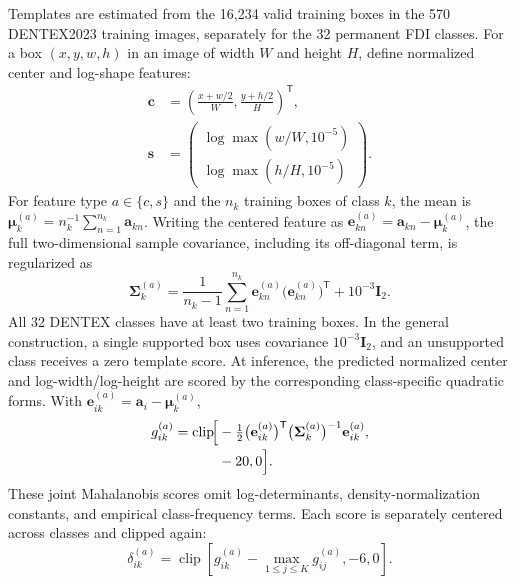 \documentclass[a4paper,fleqn]{cas-dc}
\begin{document}
Templates are estimated from the 16,234 valid training boxes in the 570 DENTEX2023 training images, separately for the 32 permanent FDI classes. For a box $(x,y,w,h)$ in an image of width $W$ and height $H$, define normalized center and log-shape features:
\begin{equation}
 \begin{aligned}
 \mathbf c&=\left(\frac{x+w/2}{W},\frac{y+h/2}{H}\right)^{\mathsf T},\\
 \mathbf s&=\begin{pmatrix}
  \log\max(w/W,10^{-5})\\
  \log\max(h/H,10^{-5})
 \end{pmatrix}.
 \end{aligned}
 \label{eq:geometry-features}
\end{equation}
For feature type $a\in\{c,s\}$ and the $n_k$ training boxes of class $k$, the mean is $\boldsymbol\mu_k^{(a)}=n_k^{-1}\sum_{n=1}^{n_k}\mathbf a_{kn}$. Writing the centered feature as $\mathbf e_{kn}^{(a)}=\mathbf a_{kn}-\boldsymbol\mu_k^{(a)}$, the full two-dimensional sample covariance, including its off-diagonal term, is regularized as
\begin{equation}
 \boldsymbol\Sigma_k^{(a)}
 =\frac{1}{n_k-1}\sum_{n=1}^{n_k}
   \mathbf e_{kn}^{(a)}\bigl(\mathbf e_{kn}^{(a)}\bigr)^{\mathsf T}
  +10^{-3}\mathbf I_2.
 \label{eq:geometry-covariance}
\end{equation}
All 32 DENTEX classes have at least two training boxes. In the general construction, a single supported box uses covariance $10^{-3}\mathbf I_2$, and an unsupported class receives a zero template score. At inference, the predicted normalized center and log-width/log-height are scored by the corresponding class-specific quadratic forms. With $\mathbf e_{ik}^{(a)}=\mathbf a_i-\boldsymbol\mu_k^{(a)}$,
\begin{equation}
 \begin{aligned}
 g_{ik}^{(a)}=\operatorname{clip}\!\Bigl[
 &-\tfrac12\bigl(\mathbf e_{ik}^{(a)}\bigr)^{\mathsf T}
  \bigl(\boldsymbol\Sigma_k^{(a)}\bigr)^{-1}\mathbf e_{ik}^{(a)},\\[-1pt]
 &-20,0\Bigr].
 \end{aligned}
 \label{eq:geometry-score}
\end{equation}
These joint Mahalanobis scores omit log-determinants, density-normalization constants, and empirical class-frequency terms. Each score is separately centered across classes and clipped again:
\begin{equation}
 \delta_{ik}^{(a)}=\operatorname{clip}\!\left[
 g_{ik}^{(a)}-\max_{1\leq j\leq K}g_{ij}^{(a)},-6,0\right].
 \label{eq:geometry-correction}
\end{equation}
\end{document}
